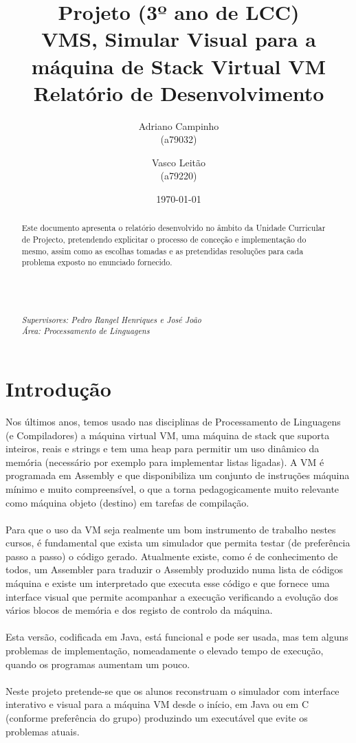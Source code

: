 \documentclass{report}
\title{Projeto (3º ano de LCC)\\ \textbf{VMS, Simular Visual para a máquina de Stack Virtual VM}\\ Relatório de Desenvolvimento}
\author{Adriano Campinho\\ (a79032) \and Vasco Leitão\\ (a79220) }
\date{\today}
\def\supers#1{{\em Supervisores: #1}\\ }
\def\area#1{{\em \'{A}rea: #1}\\[0.2cm]}
\begin{document}
\maketitle
\begin{abstract}
	\quad Este documento apresenta o relatório desenvolvido no âmbito da Unidade Curricular de Projecto, pretendendo
	explicitar o processo de conceção e implementação do mesmo, assim como as escolhas tomadas e as pretendidas resoluções
	para cada problema exposto no enunciado fornecido. \\
	\\
	\\
	\\
  \\
	\supers{Pedro Rangel Henriques e José João}
	\area{Processamento de Linguagens}

\end{abstract}

\tableofcontents

\chapter{Introdução} \label{intro}

\quad Nos últimos anos, temos usado nas disciplinas de Processamento de Linguagens (e
Compiladores) a máquina virtual VM, uma máquina de stack que suporta inteiros, reais e
strings e tem uma heap para permitir um uso dinâmico da memória (necessário por exemplo
para implementar listas ligadas). A VM é programada em Assembly e que disponibiliza um
conjunto de instruções máquina mínimo e muito compreensível, o que a torna
pedagogicamente muito relevante como máquina objeto (destino) em tarefas de compilação.
\\
\\
\null\quad Para que o uso da VM seja realmente um bom instrumento de trabalho nestes cursos, é
fundamental que exista um simulador que permita testar (de preferência passo a passo) o
código gerado. Atualmente existe, como é de conhecimento de todos, um Assembler para
traduzir o Assembly produzido numa lista de códigos máquina e existe um interpretado que
executa esse código e que fornece uma interface visual que permite acompanhar a execução
verificando a evolução dos vários blocos de memória e dos registo de controlo da máquina.
\\
\\
\null\quad Esta versão, codificada em Java, está funcional e pode ser usada, mas tem alguns problemas de
implementação, nomeadamente o elevado tempo de execução, quando os programas
aumentam um pouco.
\\
\\
\null\quad Neste projeto pretende-se que os alunos reconstruam o simulador com interface interativo e
visual para a máquina VM desde o início, em Java ou em C (conforme preferência do grupo)
produzindo um executável que evite os problemas atuais.
\end{document}
